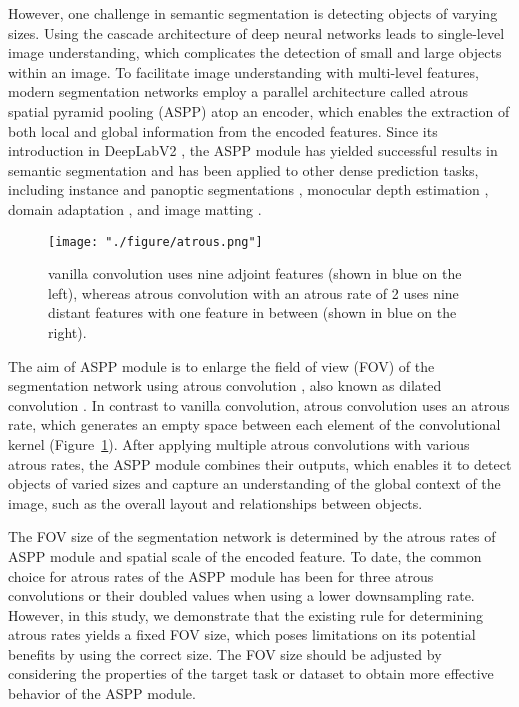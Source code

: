 \documentclass{article}
\def\figref#1{Figure~\ref{#1}}
\begin{document}
However, one challenge in semantic segmentation is detecting objects of varying sizes. Using the cascade architecture of deep neural networks leads to single-level image understanding, which complicates the detection of small and large objects within an image. To facilitate image understanding with multi-level features, modern segmentation networks employ a parallel architecture called atrous spatial pyramid pooling (ASPP) atop an encoder, which enables the extraction of both local and global information from the encoded features. Since its introduction in DeepLabV2 \citep{DBLP:journals/pami/ChenPKMY18}, the ASPP module has yielded successful results in semantic segmentation and has been applied to other dense prediction tasks, including instance \citep{DBLP:conf/cvpr/ChenPWXLSF0SOLL19} and panoptic segmentations \citep{DBLP:journals/corr/abs-2011-11675,DBLP:conf/cvpr/ChengCZ0HAC20}, monocular depth estimation \citep{DBLP:journals/corr/abs-1907-10326,DBLP:conf/cvpr/FuGWBT18}, domain adaptation \citep{DBLP:conf/mm/GaoZZT21,DBLP:conf/cvpr/GuoYLY21,DBLP:conf/ijcnn/MarsdenBDY22,DBLP:journals/tip/ZhengY22}, and image matting \citep{DBLP:conf/iccv/0003DSX19}.

\begin{figure}[t!]
	\centering
	\texttt{[image: "./figure/atrous.png"]}
	\caption{ vanilla convolution uses nine adjoint features (shown in blue on the left), whereas  atrous convolution with an atrous rate of 2 uses nine distant features with one feature in between (shown in blue on the right).}
	\label{fig:atrous}
\end{figure}

The aim of ASPP module is to enlarge the field of view (FOV) of the segmentation network using atrous convolution \citep{DBLP:journals/pami/ChenPKMY18}, also known as dilated convolution \citep{DBLP:conf/cvpr/YuKF17,DBLP:journals/corr/YuK15}. In contrast to vanilla convolution, atrous convolution uses an atrous rate, which generates an empty space between each element of the convolutional kernel (\figref{fig:atrous}). After applying multiple atrous convolutions with various atrous rates, the ASPP module combines their outputs, which enables it to detect objects of varied sizes and capture an understanding of the global context of the image, such as the overall layout and relationships between objects.

The FOV size of the segmentation network is determined by the atrous rates of ASPP module and spatial scale of the encoded feature. To date, the common choice for atrous rates of the ASPP module has been  for three atrous convolutions or their doubled values when using a lower downsampling rate. However, in this study, we demonstrate that the existing rule for determining atrous rates yields a fixed FOV size, which poses limitations on its potential benefits by using the correct size. The FOV size should be adjusted by considering the properties of the target task or dataset to obtain more effective behavior of the ASPP module.
\end{document}
